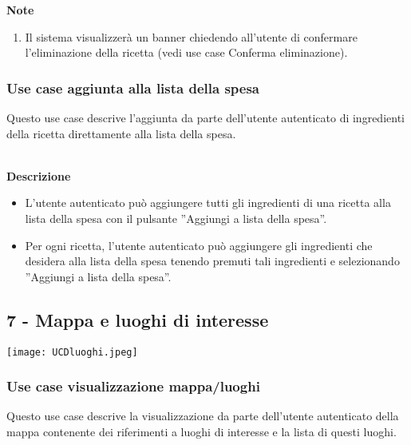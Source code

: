 \documentclass[a4paper,12pt]{article}
\begin{document}
\textbf{Note}
\begin{enumerate} \setlength\itemsep{0.01em}
\item Il sistema visualizzerà un banner chiedendo all'utente di confermare l'eliminazione della ricetta  (vedi use case Conferma eliminazione).
\end{enumerate}




\subsubsection*{Use case aggiunta alla lista della spesa}

 Questo use case descrive l'aggiunta da parte dell'utente autenticato di ingredienti della ricetta direttamente alla lista della spesa.
 
\textbf{\\Descrizione}
\begin{itemize} \setlength\itemsep{0.01em}
\item L'utente autenticato può aggiungere tutti gli ingredienti di una ricetta alla lista della spesa con il pulsante ''Aggiungi a lista della spesa''.
\item Per ogni ricetta, l'utente autenticato può aggiungere gli ingredienti che desidera alla lista della spesa tenendo premuti tali ingredienti e selezionando ''Aggiungi a lista della spesa''.
\end{itemize}







\subsection*{7 - Mappa e luoghi di interesse }

\begin{center}
  \texttt{[image: UCDluoghi.jpeg]}
\end{center}



\subsubsection*{Use case visualizzazione mappa/luoghi}

Questo use case descrive la visualizzazione da parte dell'utente autenticato della mappa contenente dei riferimenti a luoghi di interesse e la lista di questi luoghi.
\end{document}
